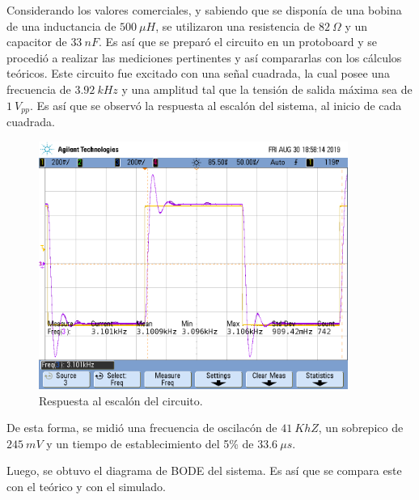 Considerando los valores comerciales, y sabiendo que se disponía de una bobina de una inductancia de $500 \ \mu H$, se utilizaron una resistencia de $82 \ \Omega$ y un capacitor de $33 \ nF$. Es así que se preparó el circuito en un protoboard y se procedió a realizar las mediciones pertinentes y así compararlas con los cálculos teóricos. Este circuito fue excitado con una señal cuadrada, la cual posee una frecuencia de $3.92 \ kHz$ y una amplitud tal que la tensión de salida máxima sea de $1 \ V_{pp}$. Es así que se observó la respuesta al escalón del sistema, al inicio de cada cuadrada.

\begin{figure}[H]
	\centering
	\includegraphics[width=0.9\textwidth, trim = {0 3.4cm 0.4cm 2cm},clip]{Ejercicio2/Mediciones/A/scope_0.png}
\caption{Respuesta al escalón del circuito.}
	\label{fig:rtaescalon}
\end{figure}

De esta forma, se midió una frecuencia de oscilacón de $41 \ KhZ $, un sobrepico de $245 \ mV$ y un tiempo de establecimiento del 5\% de $33.6 \ \mu s$.

Luego, se obtuvo el diagrama de BODE del sistema. Es así que se compara este con el teórico y con el simulado.

